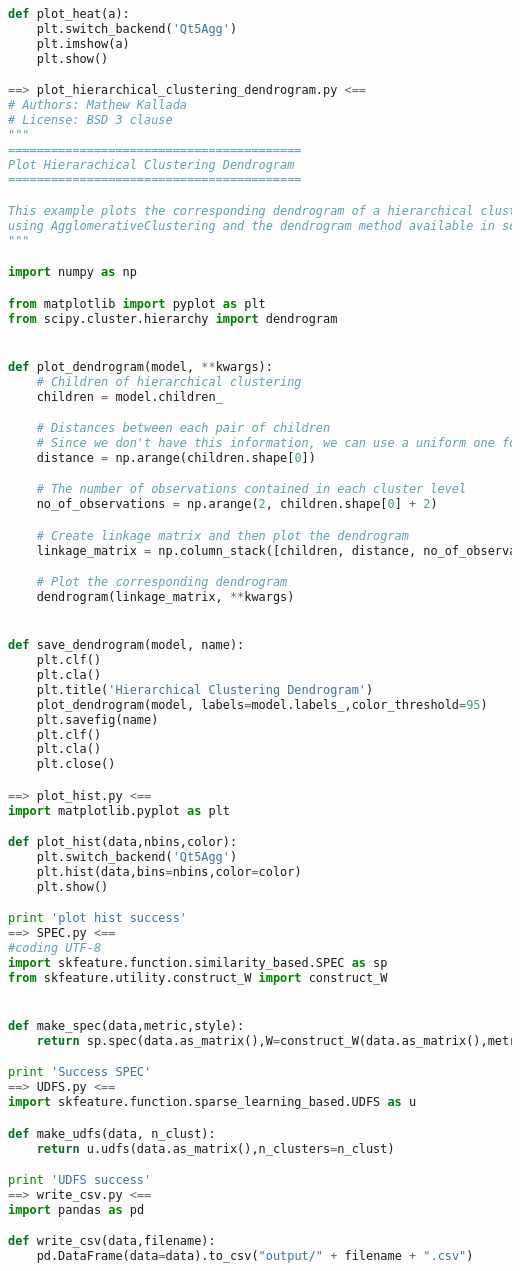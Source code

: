\begin{lstlisting}[columns=fullflexible,language=Python]
def plot_heat(a):
    plt.switch_backend('Qt5Agg')
    plt.imshow(a)
    plt.show()

==> plot_hierarchical_clustering_dendrogram.py <==
# Authors: Mathew Kallada
# License: BSD 3 clause
"""
=========================================
Plot Hierarachical Clustering Dendrogram 
=========================================

This example plots the corresponding dendrogram of a hierarchical clustering
using AgglomerativeClustering and the dendrogram method available in scipy.
"""

import numpy as np

from matplotlib import pyplot as plt
from scipy.cluster.hierarchy import dendrogram


def plot_dendrogram(model, **kwargs):
    # Children of hierarchical clustering
    children = model.children_

    # Distances between each pair of children
    # Since we don't have this information, we can use a uniform one for plotting
    distance = np.arange(children.shape[0])

    # The number of observations contained in each cluster level
    no_of_observations = np.arange(2, children.shape[0] + 2)

    # Create linkage matrix and then plot the dendrogram
    linkage_matrix = np.column_stack([children, distance, no_of_observations]).astype(float)

    # Plot the corresponding dendrogram
    dendrogram(linkage_matrix, **kwargs)


def save_dendrogram(model, name):
    plt.clf()
    plt.cla()
    plt.title('Hierarchical Clustering Dendrogram')
    plot_dendrogram(model, labels=model.labels_,color_threshold=95)
    plt.savefig(name)
    plt.clf()
    plt.cla()
    plt.close()

==> plot_hist.py <==
import matplotlib.pyplot as plt

def plot_hist(data,nbins,color):
    plt.switch_backend('Qt5Agg')
    plt.hist(data,bins=nbins,color=color)
    plt.show()

print 'plot hist success'
==> SPEC.py <==
#coding UTF-8
import skfeature.function.similarity_based.SPEC as sp
from skfeature.utility.construct_W import construct_W


def make_spec(data,metric,style):
    return sp.spec(data.as_matrix(),W=construct_W(data.as_matrix(),metric=metric),style=style)

print 'Success SPEC'
==> UDFS.py <==
import skfeature.function.sparse_learning_based.UDFS as u

def make_udfs(data, n_clust):
    return u.udfs(data.as_matrix(),n_clusters=n_clust)

print 'UDFS success'
==> write_csv.py <==
import pandas as pd

def write_csv(data,filename):
    pd.DataFrame(data=data).to_csv("output/" + filename + ".csv")
\end{lstlisting}